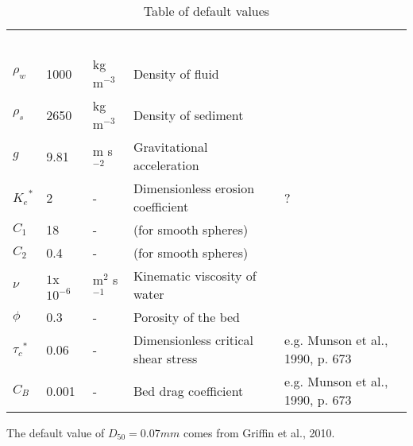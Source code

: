 \documentclass[11pt]{article}
\begin{document}
\begin{table}[]
\centering
\caption{Table of default values}
\begin{tabular}{|l|l|l|l|l|}
\ \\ \cline{1-5}
$\rho_w$ & 1000 & kg m$^{-3}$ & Density of fluid           &  \\ \cline{1-5}
$\rho_s$ & 2650 & kg m$^{-3}$ & Density of sediment        &  \\ \cline{1-5}
$g$      & 9.81 & m s$^{-2}$  & Gravitational acceleration &  \\ \cline{1-5}
${K_e}^*$         &   2   & - & Dimensionless erosion coefficient &  ?\\ \cline{1-5}
$C_1$         &  18    &       -      & (for smooth spheres)                           & \citep{ferguson2004simple} \\ \cline{1-5}
$C_2$         &    0.4  &       -      & (for smooth spheres)                            & \citep{ferguson2004simple} \\ \cline{1-5}
$\nu$         &  $1$x${10}^{-6}$    &   m$^2$ s$^{-1}$          &   Kinematic viscosity of water                         &  \\ \cline{1-5}
$\phi$         &   0.3   &     -        & Porosity of the bed  & &\\ \cline{1-5}
${\tau_c}^*$         &   0.06   &     -        & Dimensionless critical shear stress     & e.g. Munson et al., 1990, p. 673 &\\ \cline{1-5}
$C_B$         &   0.001   &     -        & Bed drag coefficient                           & e.g. Munson et al., 1990, p. 673 &\\ \cline{1-5}
\end{tabular}
\end{table}

The default value of $D_{50} = 0.07 mm$ comes from Griffin et al., 2010.
\end{document}
